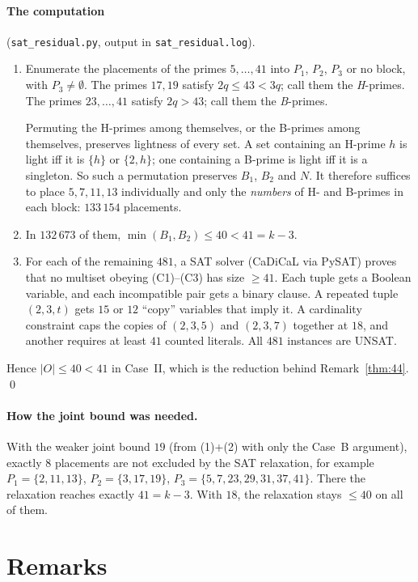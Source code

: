 \documentclass[11pt]{article}
\theoremstyle{definition}
\theoremstyle{remark}
\begin{document}
\paragraph{The computation} (\texttt{sat\_residual.py}, output in \texttt{sat\_residual.log}).
\begin{enumerate}
\item Enumerate the placements of the primes $5,\dots,41$ into $P_1$, $P_2$, $P_3$ or no block,
  with $P_3\ne\emptyset$. The primes $17,19$ satisfy $2q\le43<3q$; call them the \emph{H}-primes.
  The primes $23,\dots,41$ satisfy $2q>43$; call them the \emph{B}-primes.

  Permuting the H-primes among themselves, or the B-primes among themselves, preserves
  lightness of every set. A set containing an H-prime $h$ is light iff it is $\{h\}$ or
  $\{2,h\}$; one containing a B-prime is light iff it is a singleton. So such a permutation
  preserves $B_1$, $B_2$ and $N$. It therefore suffices to place $5,7,11,13$ individually and
  only the \emph{numbers} of H- and B-primes in each block: $133\,154$ placements.
\item In $132\,673$ of them, $\min(B_1,B_2)\le40<41=k-3$.
\item For each of the remaining $481$, a SAT solver (CaDiCaL via PySAT) proves that no multiset
  obeying (C1)--(C3) has size $\ge41$. Each tuple gets a Boolean variable, and each incompatible
  pair gets a binary clause. A repeated tuple $(2,3,t)$ gets $15$ or $12$ ``copy'' variables that
  imply it. A cardinality constraint caps the copies of $(2,3,5)$ and $(2,3,7)$ together at $18$,
  and another requires at least $41$ counted literals. All $481$ instances are UNSAT.
\end{enumerate}
Hence $|O|\le40<41$ in Case~II, which is the reduction behind Remark~\ref{thm:44}. \qed

\paragraph{How the joint bound was needed.} With the weaker joint bound $19$ (from (1)+(2) with
only the Case~B argument), exactly $8$ placements are not excluded by the SAT relaxation, for
example $P_1=\{2,11,13\}$, $P_2=\{3,17,19\}$, $P_3=\{5,7,23,29,31,37,41\}$. There the relaxation
reaches exactly $41=k-3$. With $18$, the relaxation stays $\le40$ on all of them.

\section{Remarks}
\end{document}
